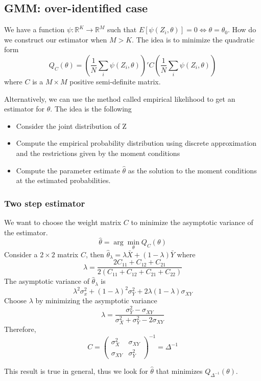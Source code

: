 \documentclass[11pt, a4paper, oneside]{article}
\theoremstyle{definition}
\theoremstyle{proposition}
\theoremstyle{corollary}
\theoremstyle{lemma}
\theoremstyle{theorem}
\begin{document}
\subsection{GMM: over-identified case}
We have a function $\psi: \mathbb{R}^K \to \mathbb{R}^M$ such that $E[\psi(Z_i, \theta)] = 0 \iff \theta = \theta_0$. How do we construct our estimator when $M > K$. The idea is to minimize the quadratic form
$$Q_C(\theta) = \left(\frac{1}{N}\sum_i \psi(Z_i, \theta)\right)'C\left(\frac{1}{N}\sum_i \psi(Z_i, \theta)\right)$$
where $C$ is a $M\times M$ positive semi-definite matrix. 

Alternatively, we can use the method called empirical likelihood to get an estimator for $\theta$. The idea is the following
\begin{itemize}
\item Consider the joint distribution of Z
\item Compute the empirical probability distribution using discrete approximation and the restrictions given by the moment conditions
\item Compute the parameter estimate $\hat{\theta}$ as the solution to the moment conditions at the estimated probabilities. 
\end{itemize}

\subsubsection{Two step estimator}
We want to choose the weight matrix $C$ to minimize the asymptotic variance of the estimator.
$$\hat{\theta} = \arg \min_{\theta} Q_C(\theta)$$
Consider a $2\times2$ matrix $C$, then $\hat{\theta}_{\lambda} = \lambda \bar{X} +(1-\lambda)\bar{Y}$ where
$$\lambda = \frac{2C_{11}+C_{12} + C_{21}}{2(C_{11}+C_{12} +C_{21}+C_{22})}$$
The asymptotic variance of $\hat{\theta}_{\lambda}$ is 
$$\lambda^2\sigma_x^2 +(1-\lambda)^2\sigma_Y^2 + 2\lambda(1-\lambda)\sigma_{XY}$$
Choose $\lambda$ by minimizing the asymptotic variance
$$\lambda = \frac{\sigma^2_Y -\sigma_{XY}}{\sigma_X^2+\sigma_Y^2 - 2\sigma_{XY}}$$
Therefore,
$$C=\begin{pmatrix} \sigma_X^2 & \sigma_{XY} \\ \sigma_{XY} & \sigma_Y^2\end{pmatrix}^{-1} = \Delta^{-1}$$

This result is true in general, thus we look for $\hat{\theta}$ that minimizes $Q_{\Delta^{-1}}(\theta)$.
\end{document}
